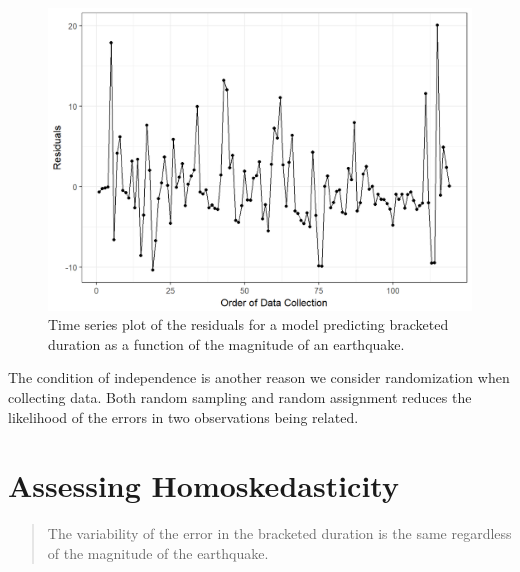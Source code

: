 \documentclass[]{book}
\theoremstyle{plain}
\theoremstyle{mydefn}
\theoremstyle{myexmpl}
\theoremstyle{remark}
\begin{document}
\begin{figure}

{\centering \includegraphics[width=0.8\linewidth]{./Images/regassessment-independence-1} 

}

\caption{Time series plot of the residuals for a model predicting bracketed duration as a function of the magnitude of an earthquake.}\label{fig:regassessment-independence}
\end{figure}

The condition of independence is another reason we consider
randomization when collecting data. Both random sampling and random
assignment reduces the likelihood of the errors in two observations
being related.

\section{Assessing Homoskedasticity}\label{assessing-homoskedasticity}

\begin{quote}
The variability of the error in the bracketed duration is the same
regardless of the magnitude of the earthquake.
\end{quote}
\end{document}
